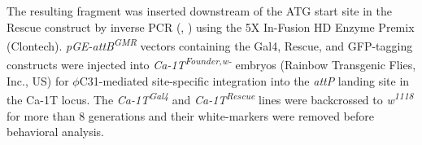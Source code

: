 The resulting fragment was inserted downstream of the ATG start site in the Rescue construct by inverse PCR (, ) using the 5X In-Fusion HD Enzyme Premix (Clontech).       
\emph{pGE-attB\textsuperscript{GMR}} vectors containing the Gal4, Rescue, and GFP-tagging constructs were injected into \emph{Ca-\alpha1T\textsuperscript{Founder,w-}} embryos (Rainbow Transgenic Flies, Inc., US) for $\phi$C31-mediated site-specific integration into the \emph{attP} landing site in the Ca-\alpha1T locus.
The \emph{Ca-\alpha1T\textsuperscript{Gal4}} and \emph{Ca-\alpha1T\textsuperscript{Rescue}} lines were backcrossed to \emph{w\textsuperscript{1118}} for more than 8 generations and their white-markers were removed before behavioral analysis.
